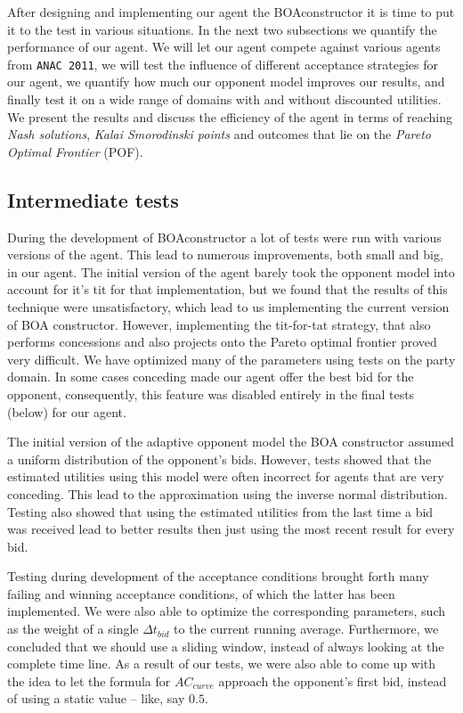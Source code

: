 After designing and implementing our agent the BOAconstructor it is time to put it to the test in various situations. In the next two subsections we quantify the performance of our agent. 
We will let our agent compete against various agents from \texttt{ANAC 2011}, we will test the influence of different acceptance strategies for our agent,
we quantify how much our opponent model improves our results, and finally test it on a wide range of domains with and without discounted utilities.
We present the results and discuss the efficiency of the agent in terms of reaching \emph{Nash solutions}, \emph{Kalai Smorodinski points} and outcomes that lie on the \emph{Pareto Optimal Frontier} (POF).

\subsection{Intermediate tests}
During the development of BOAconstructor a lot of tests were run with various versions of the agent. This lead to numerous improvements, both small and big, in our agent. The initial version of the agent barely took the opponent model into account for it's tit for that implementation, but we found that the results of this technique were unsatisfactory, which lead to us implementing the current version of BOA constructor. However, implementing the tit-for-tat strategy, that also performs concessions and also projects onto the Pareto optimal frontier proved very difficult. We have optimized many of the parameters
using tests on the party domain. In some cases conceding made our agent offer the best bid for the opponent, consequently, this feature was disabled entirely in the final tests (below) for our agent.

The initial version of the adaptive opponent model the BOA constructor assumed a uniform distribution of the opponent's bids. However, tests showed that the estimated utilities using this model were often incorrect for agents that are very conceding. This lead to the approximation using the inverse normal distribution. Testing also showed that using the estimated utilities from the last time a bid was received lead to better results then just using the most recent result for every bid.

Testing during development of the acceptance conditions brought forth many failing and winning acceptance conditions, of which the latter has been implemented. We were also able to optimize the corresponding parameters, such as the weight of a single $\Delta t_{bid}$ to the current running average. Furthermore, we concluded that we should use a sliding window, instead of always looking at the complete time line. As a result of our tests, we were also able to come up with the idea to let the formula for $AC_{curve}$ approach the opponent's first bid, instead of using a static value -- like, say $0.5$.

